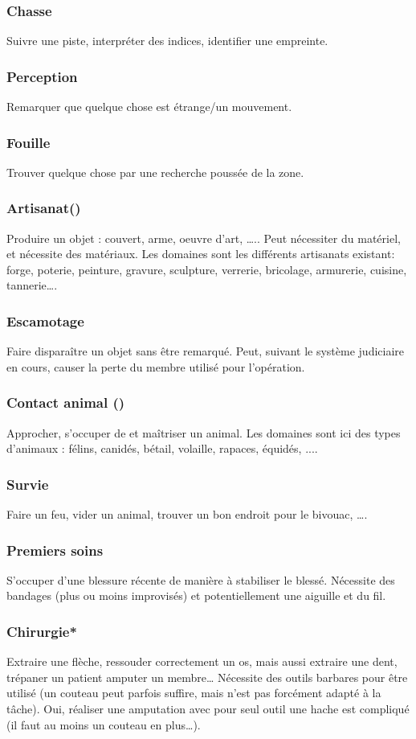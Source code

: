 \documentclass[10pt,a4paper,twocolumn]{book}
\begin{document}
\subsubsection{Chasse}
Suivre une piste, interpréter des indices, identifier une empreinte.
\subsubsection{Perception}
Remarquer que quelque chose est étrange/un mouvement.
\subsubsection{Fouille}
Trouver quelque chose par une recherche poussée de la zone.
\subsubsection{Artisanat()}
Produire un objet : couvert, arme, oeuvre d’art, ….. Peut nécessiter du matériel, et nécessite des matériaux. Les domaines sont les différents artisanats existant: forge, poterie, peinture, gravure, sculpture, verrerie, bricolage, armurerie, cuisine, tannerie….
\subsubsection{Escamotage}
Faire disparaître un objet sans être remarqué. Peut, suivant le système judiciaire en cours, causer la perte du membre utilisé pour l’opération.
\subsubsection{Contact animal ()}
Approcher, s’occuper de et maîtriser un animal. Les domaines sont ici des types d’animaux : félins, canidés, bétail, volaille, rapaces, équidés, ....
\subsubsection{Survie}
Faire un feu, vider un animal, trouver un bon endroit pour le bivouac, ….
\subsubsection{Premiers soins}
S’occuper d’une blessure récente de manière à stabiliser le blessé. Nécessite des bandages (plus ou moins improvisés) et potentiellement une aiguille et du fil.
\subsubsection{Chirurgie* }
Extraire une flèche, ressouder correctement un os, mais aussi extraire une dent, trépaner un patient amputer un membre… Nécessite des outils barbares pour être utilisé (un couteau peut parfois suffire, mais n’est pas forcément adapté à la tâche). Oui, réaliser une amputation avec pour seul outil une hache est compliqué (il faut au moins un couteau en plus…).
\end{document}
